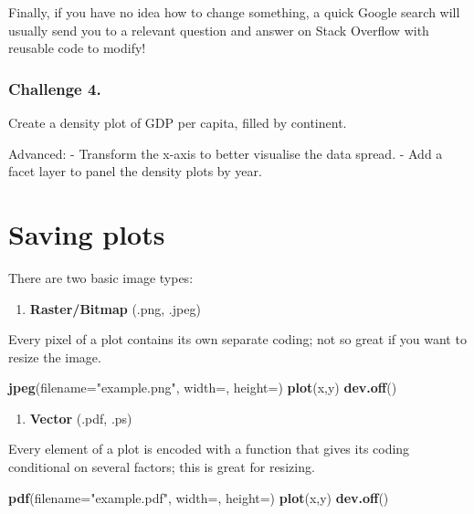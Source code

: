 \documentclass[]{book}
\newenvironment{Shaded}{\begin{snugshade}}{\end{snugshade}}
\newcommand{\KeywordTok}[1]{\textcolor[rgb]{0.13,0.29,0.53}{\textbf{#1}}}
\newcommand{\DataTypeTok}[1]{\textcolor[rgb]{0.13,0.29,0.53}{#1}}
\newcommand{\StringTok}[1]{\textcolor[rgb]{0.31,0.60,0.02}{#1}}
\newcommand{\NormalTok}[1]{#1}
\providecommand{\tightlist}{%
  \setlength{\itemsep}{0pt}\setlength{\parskip}{0pt}}
\begin{document}
Finally, if you have no idea how to change something, a quick Google
search will usually send you to a relevant question and answer on Stack
Overflow with reusable code to modify!

\subsubsection*{Challenge 4.}\label{challenge-4.-2}

Create a density plot of GDP per capita, filled by continent.

Advanced: - Transform the x-axis to better visualise the data spread. -
Add a facet layer to panel the density plots by year.

\section{Saving plots}\label{saving-plots}

There are two basic image types:

\begin{enumerate}
\def\labelenumi{\arabic{enumi})}
\tightlist
\item
  \textbf{Raster/Bitmap} (.png, .jpeg)
\end{enumerate}

Every pixel of a plot contains its own separate coding; not so great if
you want to resize the image.

\begin{Shaded}
\begin{Highlighting}[]
\KeywordTok{jpeg}\NormalTok{(}\DataTypeTok{filename=}\StringTok{"example.png"}\NormalTok{, }\DataTypeTok{width=}\NormalTok{, }\DataTypeTok{height=}\NormalTok{)}
\KeywordTok{plot}\NormalTok{(x,y)}
\KeywordTok{dev.off}\NormalTok{()}
\end{Highlighting}
\end{Shaded}

\begin{enumerate}
\def\labelenumi{\arabic{enumi})}
\setcounter{enumi}{1}
\tightlist
\item
  \textbf{Vector} (.pdf, .ps)
\end{enumerate}

Every element of a plot is encoded with a function that gives its coding
conditional on several factors; this is great for resizing.

\begin{Shaded}
\begin{Highlighting}[]
\KeywordTok{pdf}\NormalTok{(}\DataTypeTok{filename=}\StringTok{"example.pdf"}\NormalTok{, }\DataTypeTok{width=}\NormalTok{, }\DataTypeTok{height=}\NormalTok{)}
\KeywordTok{plot}\NormalTok{(x,y)}
\KeywordTok{dev.off}\NormalTok{()}
\end{Highlighting}
\end{Shaded}
\end{document}
